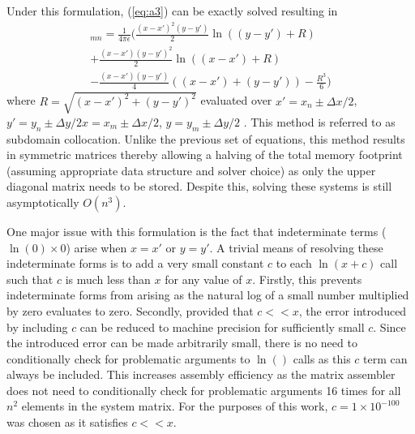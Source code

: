 Under this formulation, (\ref{eq:a3}) can be exactly solved resulting in
\begin{multline}
    [A]_{mn}=\frac{1}{4\pi\epsilon}\Big(\frac{(x-x')^2(y-y')}{2}\ln((y-y')+R) \\ +\frac{(x-x')(y-y')^2}{2}\ln((x-x')+R)\\-\frac{(x-x')(y-y')}{4}((x-x')+(y-y')) -\frac{R^3}{6}\Big)
\end{multline}
where $R=\sqrt{(x-x')^2+(y-y')^2}$ evaluated over $x'=x_n\pm\Delta x / 2$, $y'=y_n\pm\Delta y / 2 x=x_m\pm\Delta x / 2$, $y=y_m\pm\Delta y / 2$ \cite{jin2011theory}. This method is referred to as subdomain collocation. Unlike the previous set of equations, this method results in symmetric matrices thereby allowing a halving of the total memory footprint (assuming appropriate data structure and solver choice) as only the upper diagonal matrix needs to be stored. Despite this, solving these systems is still asymptotically $O(n^3)$.

One major issue with this formulation is the fact that indeterminate terms ($\ln(0)\times 0$) arise when $x=x'$ or $y=y'$. A trivial means of resolving these indeterminate forms is to add a very small constant $c$ to each $\ln(x+c)$ call such that $c$ is much less than $x$ for any value of $x$. Firstly, this prevents indeterminate forms from arising as the natural log of a small number multiplied by zero evaluates to zero. Secondly, provided that $c<<x$, the error introduced by including $c$ can be reduced to machine precision for sufficiently small $c$. Since the introduced error can be made arbitrarily small, there is no need to conditionally check for problematic arguments to $\ln()$ calls as this $c$ term can always be included. This increases assembly efficiency as the matrix assembler does not need to conditionally check for problematic arguments 16 times for all $n^2$ elements in the system matrix. For the purposes of this work, $c=1\times10^{-100}$ was chosen as it satisfies $c<<x$.